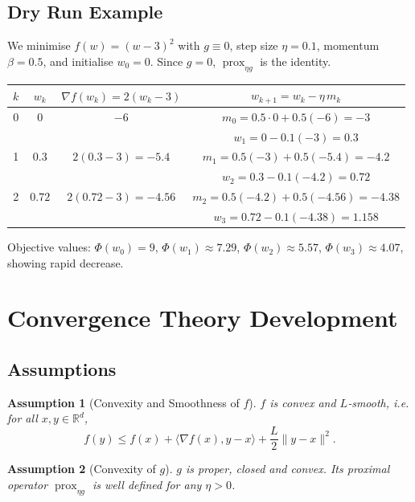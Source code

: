 \documentclass{article}
\newtheorem{assumption}{Assumption}
\newcommand{\prox}{\operatorname{prox}}
\begin{document}
\subsection*{Dry Run Example}
We minimise $f(w)=(w-3)^{2}$ with $g\equiv0$, step size $\eta=0.1$, momentum $\beta=0.5$, and initialise $w_{0}=0$.
Since $g=0$, $\prox_{\eta g}$ is the identity.

\begin{center}
\begin{tabular}{c|c|c|c}
$k$ & $w_{k}$ & $\nabla f(w_{k})=2(w_{k}-3)$ & $w_{k+1}=w_{k}-\eta\,m_{k}$ \\ \hline
0 & $0$ & $-6$ & $m_{0}=0.5\cdot0+0.5(-6)=-3$\\
  &   &   & $w_{1}=0-0.1(-3)=0.3$ \\ \hline
1 & $0.3$ & $2(0.3-3)=-5.4$ & $m_{1}=0.5(-3)+0.5(-5.4)=-4.2$\\
  &   &   & $w_{2}=0.3-0.1(-4.2)=0.72$ \\ \hline
2 & $0.72$ & $2(0.72-3)=-4.56$ & $m_{2}=0.5(-4.2)+0.5(-4.56)=-4.38$\\
  &   &   & $w_{3}=0.72-0.1(-4.38)=1.158$ \\ \hline
\end{tabular}
\end{center}

Objective values: $\Phi(w_{0})=9$, $\Phi(w_{1})\approx7.29$, $\Phi(w_{2})\approx5.57$, $\Phi(w_{3})\approx4.07$, showing rapid decrease.

\newpage
\section*{Convergence Theory Development}

\subsection*{Assumptions}
\begin{assumption}[Convexity and Smoothness of $f$]\label{ass:f}
$f$ is convex and $L$‑smooth, i.e. for all $x,y\in\mathbb{R}^{d}$,
\[
f(y)\le f(x)+\langle\nabla f(x),y-x\rangle+\frac{L}{2}\|y-x\|^{2}.
\tag{A1}
\]
\end{assumption}

\begin{assumption}[Convexity of $g$]\label{ass:g}
$g$ is proper, closed and convex. Its proximal operator $\prox_{\eta g}$ is well defined for any $\eta>0$.
\end{assumption}
\end{document}
